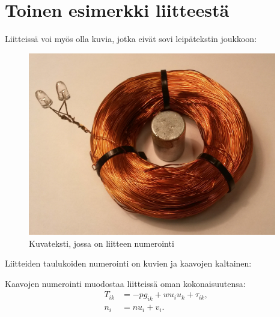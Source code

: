 \documentclass[english, 12pt, a4paper, sci, utf8, a-1b, online]{aaltothesis}
\begin{document}
\clearpage
\section{Toinen esimerkki liitteestä\label{LiiteB}}


Liitteissä voi myös olla kuvia, jotka
eivät sovi leipätekstin joukkoon:
\begin{figure}[htb]
\centering
\includegraphics[height=8cm]{./ledspole.jpg}
\caption{Kuvateksti, jossa on liitteen numerointi}
\label{liitekuva}
\end{figure}
Liitteiden taulukoiden numerointi on kuvien ja kaavojen kaltainen:
\begin{table}[htb]
\caption{Taulukon kuvateksti.}
\label{liitetaulukko}
\centering
{}
\end{table}
Kaavojen numerointi muodostaa liitteissä oman kokonaisuutensa:
\begin{align}
T_{ik} &= -p g_{ik} + w u_i u_k + \tau_{ik},  \label{liitekaava3} \\
n_i    &= n u_i + v_i.                      \label{liitekaava4}
\end{align}
\end{document}
